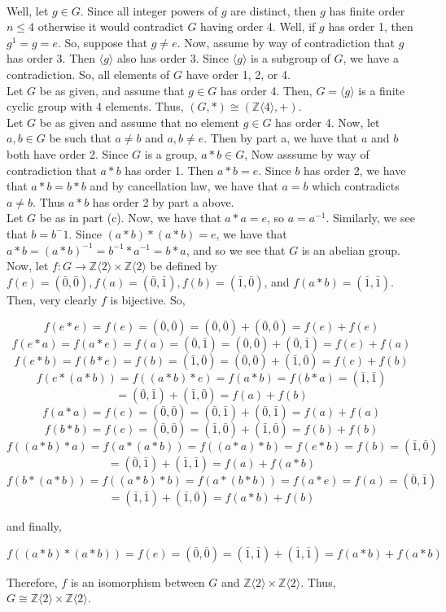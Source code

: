 \begin{solution}\renewcommand{\qedsymbol}{}\ \\
    Well, let $g\in G$. Since all integer powers of $g$ are distinct, then $g$ has finite order $n\leq4$
    otherwise it would contradict $G$ having order 4. Well, if $g$ has order 1, then $g^1=g=e$. So,
    suppose that $g\neq e$. Now, assume by way of contradiction that $g$ has order 3. Then
    $\langle g\rangle$ also has order 3. Since $\langle g\rangle$ is a subgroup of $G$, we have a
    contradiction. So, all elements of $G$ have order 1, 2, or 4.\\

    Let $G$ be as given, and assume that $g\in G$ has order 4. Then, $G=\langle g\rangle$ is a finite
    cyclic group with 4 elements. Thus, $(G,*)\cong(\mathbb{Z}\langle4\rangle,+)$.\\

    Let $G$ be as given and assume that no element $g\in G$ has order 4. Now, let $a,b\in G$ be such
    that $a\neq b$ and $a,b\neq e$. Then by part a, we have that $a$ and $b$ both have order 2. Since
    $G$ is a group, $a*b\in G$, Now asssume by way of contradiction that $a*b$ has order 1. Then
    $a*b=e$. Since $b$ has order 2, we have that $a*b=b*b$ and by cancellation law, we have that $a=b$
    which contradicts $a\neq b$. Thus $a*b$ has order 2 by part a above.\\

    Let $G$ be as in part (c). Now, we have that $a*a=e$, so $a=a^{-1}$. Similarly, we see that
    $b=b^-1$. Since $(a*b)*(a*b)=e$, we have that $a*b=(a*b)^{-1}=b^{-1}*a^{-1}=b*a$, and so we see that
    $G$ is an abelian group. Now, let
    $f:G\rightarrow\mathbb{Z}\langle2\rangle\times\mathbb{Z}\langle2\rangle$ be defined by
    $f(e)=(\bar{0},\bar{0}), f(a)=(\bar{0},\bar{1}), f(b)=(\bar{1},\bar{0})$, and
    $f(a*b)=(\bar{1},\bar{1})$. Then, very clearly $f$ is bijective. So,
    
    $$f(e*e)=f(e)=(\bar{0},\bar{0})=(\bar{0},\bar{0})+(\bar{0},\bar{0})=f(e)+f(e)$$
    $$f(e*a)=f(a*e)=f(a)=(\bar{0},\bar{1})=(\bar{0},\bar{0})+(\bar{0},\bar{1})=f(e)+f(a)$$
    $$f(e*b)=f(b*e)=f(b)=(\bar{1},\bar{0})=(\bar{0},\bar{0})+(\bar{1},\bar{0})=f(e)+f(b)$$
    $$f(e*(a*b))=f((a*b)*e)=f(a*b)=f(b*a)=(\bar{1},\bar{1})$$
    $$=(\bar{0},\bar{1})+(\bar{1},\bar{0})=f(a)+f(b)$$
    $$f(a*a)=f(e)=(\bar{0},\bar{0})=(\bar{0},\bar{1})+(\bar{0},\bar{1})=f(a)+f(a)$$
    $$f(b*b)=f(e)=(\bar{0},\bar{0})=(\bar{1},\bar{0})+(\bar{1},\bar{0})=f(b)+f(b)$$
    $$f((a*b)*a)=f(a*(a*b))=f((a*a)*b)=f(e*b)=f(b)=(\bar{1},\bar{0})$$
    $$=(\bar{0},\bar{1})+(\bar{1},\bar{1})=f(a)+f(a*b)$$
    $$f(b*(a*b))=f((a*b)*b)=f(a*(b*b))=f(a*e)=f(a)=(\bar{0},\bar{1})$$
    $$=(\bar{1},\bar{1})+(\bar{1},\bar{0})=f(a*b)+f(b)$$
    
    and finally,
    
    $$f((a*b)*(a*b))=f(e)=(\bar{0},\bar{0})=(\bar{1},\bar{1})+(\bar{1},\bar{1})=f(a*b)+f(a*b)$$
    
    Therefore, $f$ is an isomorphism between $G$ and
    $\mathbb{Z}\langle2\rangle\times\mathbb{Z}\langle2\rangle$. Thus,
    $G\cong\mathbb{Z}\langle2\rangle\times\mathbb{Z}\langle2\rangle$.

\end{solution}